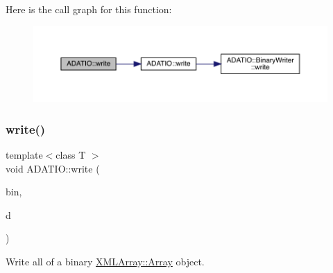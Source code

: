 Here is the call graph for this function\+:
\nopagebreak
\begin{figure}[H]
\begin{center}
\leavevmode
\includegraphics[width=350pt]{d0/dba/namespaceADATIO_a4d080cdbb3d8b34b2e8cf03001f8b7f0_cgraph}
\end{center}
\end{figure}
\mbox{\label{namespaceADATIO_a70c8ce102a5eca8961bb57bf7b8b6bd1}} 
\subsubsection{\texorpdfstring{write()}{write()}\hspace{0.1cm}{\footnotesize\ttfamily [15/25]}}
{\footnotesize\ttfamily template$<$class T $>$ \\
void A\+D\+A\+T\+I\+O\+::write (\begin{DoxyParamCaption}\item[{\mbox{\hyperlink{classADATIO_1_1BinaryWriter}{Binary\+Writer}} \&}]{bin,  }\item[{const \mbox{\hyperlink{classXMLArray_1_1Array}{X\+M\+L\+Array\+::\+Array}}$<$ T $>$ \&}]{d }\end{DoxyParamCaption})\hspace{0.3cm}{\ttfamily [inline]}}



Write all of a binary \mbox{\hyperlink{classXMLArray_1_1Array}{X\+M\+L\+Array\+::\+Array}} object. 

